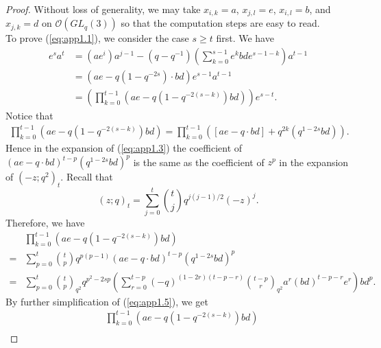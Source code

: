 \documentclass[table,a4paper,reqno]{amsart}
\numberwithin{equation}{section}
\theoremstyle{definition}
\begin{document}
\begin{proof}
     Without loss of generality, we may take $x_{i,k}=a$, $x_{j,l}=e$, $x_{i,l}=b$, and $x_{j,k}=d$ on $\mathcal{O}(GL_q(3))$ so that the computation steps are easy to read.\\
     To prove (\ref{eq:app1.1}), we consider the case $s\ge t$ first. We have
    \begin{equation}\label{eq:app1.2}
        \begin{split}
            e^sa^t&=(ae^i)a^{j-1}-(q-q^{-1})\left(\sum_{k=0}^{s-1}e^{k}bde^{s-1-k}\right)a^{t-1}\\
            &=(ae-q(1-q^{-2s})\cdot bd)e^{s-1}a^{t-1}\\
            &=\left(\prod_{k=0}^{t-1}(ae-q(1-q^{-2(s-k)})bd)\right)e^{s-t}.
        \end{split}
    \end{equation}
    Notice that
    \begin{equation}\label{eq:app1.3}
        \begin{split}
            \prod_{k=0}^{t-1}(ae-q(1-q^{-2(s-k)})bd)=\prod_{k=0}^{t-1}\left([ae-q\cdot bd]+q^{2k}(q^{1-2s}bd)\right).
        \end{split}
    \end{equation}
    Hence in the expansion of (\ref{eq:app1.3}) the coefficient of $(ae-q\cdot bd)^{t-p}(q^{1-2s}bd)^p$ is the same as the coefficient of $z^p$ in the expansion of $(-z;q^2)_t$. Recall that 
    \begin{equation}
        (z;q)_t=\sum_{j=0}^t{t\choose j}q^{j(j-1)/2}(-z)^j.
    \end{equation}
    Therefore, we have
    \begin{equation}\label{eq:app1.5}
        \begin{split}
            &\prod_{k=0}^{t-1}(ae-q(1-q^{-2(s-k)})bd)\\
            =&\sum_{p=0}^t{t\choose p}q^{p(p-1)}(ae-q\cdot bd)^{t-p}(q^{1-2s}bd)^p\\
            =&\sum_{p=0}^t{t\choose p}_{q^2}q^{p^2-2sp}\left(\sum_{r=0}^{t-p}(-q)^{(1-2r)(t-p-r)}{t-p\choose r}_{q^2}a^r(bd)^{t-p-r}e^r\right)bd^p.
        \end{split}
    \end{equation}
    By further simplification of (\ref{eq:app1.5}), we get
    \begin{equation}
        \begin{split}
            &\prod_{k=0}^{t-1}(ae-q(1-q^{-2(s-k)})bd)\\

\end{split}
\end{equation}
\end{proof}
\end{document}
